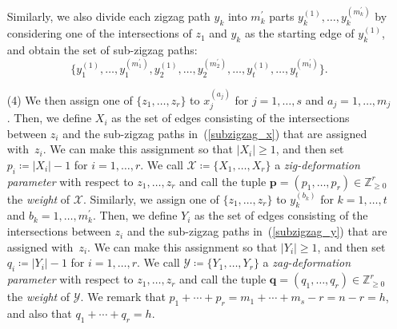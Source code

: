 \documentclass[pdftex]{sigma}%
\numberwithin{equation}{section}
\numberwithin{figure}{section}
\numberwithin{table}{section}
\newcommand{\ZZ}{\mathbb{Z}}
\newcommand{\calX}{\mathcal{X}}
\newcommand{\calY}{\mathcal{Y}}
\newcommand{\bfp}{\mathbf{p}}
\newcommand{\bfq}{\mathbf{q}}
\begin{document}
\begin{setting}
\begin{itemize}
Similarly, we also divide each zigzag path $y_k$ into $m^\prime_k$ parts $y_k^{(1)},\dots,y_k^{(m^\prime_k)}$
by considering one of the intersections of $z_1$ and $y_k$ as the starting edge of $y_k^{(1)}$, and obtain the set of sub-zigzag paths:
\begin{equation}\label{subzigzag_y}
\big\{y_1^{(1)},\dots,y_1^{(m^\prime_1)}, y_2^{(1)},\dots,y_2^{(m^\prime_2)}, \dots, y_t^{(1)},\dots,y_t^{(m^\prime_t)}\big\}.
\end{equation}
\item[(4)]
We then assign one of $\{z_1, \dots, z_r\}$ to $x_j^{(a_j)}$ for $j=1, \dots, s$ and $a_j=1, \dots, m_j$.
Then, we define $X_i$ as the set of edges consisting of the intersections between $z_i$ and the sub-zigzag paths in~(\ref{subzigzag_x}) that are assigned with~$z_i$.
We can make this assignment so that $|X_i|\ge1$, and then set $p_i\coloneqq|X_i|-1$ for $i=1,\dots,r$.
We call $\calX\coloneqq\{X_1,\dots,X_r\}$ a \emph{zig-deformation parameter} with respect to $z_1,\dots,z_r$ and call the tuple $\bfp=(p_1,\dots,p_r)\in\ZZ^r_{\ge0}$ the \emph{weight} of $\calX$.
Similarly, we assign one of $\{z_1, \dots, z_r\}$ to $y_k^{(b_k)}$ for $k=1, \dots, t$ and $b_k=1, \dots, m^\prime_k$.
Then, we define $Y_i$ as the set of edges consisting of the intersections between $z_i$ and the sub-zigzag paths in~(\ref{subzigzag_y}) that are assigned with~$z_i$.
We can make this assignment so that $|Y_i|\ge1$, and then set $q_i\coloneqq|Y_i|-1$ for $i=1,\dots,r$.
We call $\calY\coloneqq\{Y_1,\dots,Y_r\}$ a \emph{zag-deformation parameter} with respect to $z_1,\dots,z_r$ and call the tuple $\bfq=(q_1,\dots,q_r)\in\ZZ^r_{\ge0}$ the \emph{weight} of $\calY$.
We remark that $p_1+\cdots+p_r=m_1+\cdots+m_s-r=n-r=h$, and also that $q_1+\cdots+q_r=h$.
\end{itemize}
\end{setting}
\end{document}
